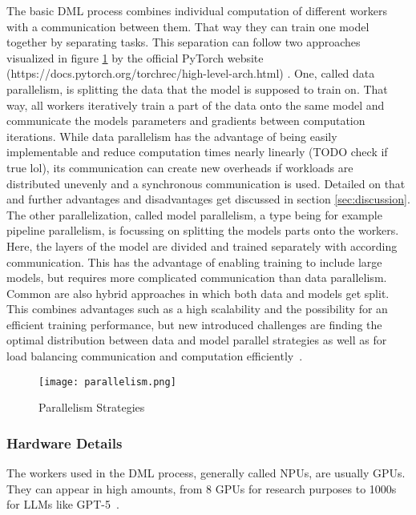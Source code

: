 The basic \ac{DML} process combines individual computation of different workers with a communication between them. That way they can train one model together by separating tasks. This separation can follow two approaches visualized in figure \ref{fig:parallelism} by the official PyTorch website (https://docs.pytorch.org/torchrec/high-level-arch.html) \cite{noauthor_torchrec_nodate}. %
One, called data parallelism, is splitting the data that the model is supposed to train on. That way, all workers iteratively train a part of the data onto the same model and communicate the models parameters and gradients between computation iterations. 
While data parallelism has the advantage of being easily implementable and reduce computation times nearly linearly (TODO check if true lol), its communication can create new overheads if workloads are distributed unevenly and a synchronous communication is used. Detailed on that and further advantages and disadvantages get discussed in section \ref{sec:discussion}.
The other parallelization, called model parallelism, a type being for example pipeline parallelism, is focussing on splitting the models parts onto the workers. Here, the layers of the model are divided and trained separately with according communication. This has the advantage of enabling training to include large models, but requires more complicated communication than data parallelism.
Common are also hybrid approaches in which both data and models get split. This combines advantages such as a high scalability and the possibility for an efficient training performance, but new introduced challenges are finding the optimal distribution  between data and model parallel strategies as well as for load balancing communication and computation efficiently~\cite{boehm_hybrid_2014}.

\begin{figure}[h]  %
  \centering
  \texttt{[image: parallelism.png]}
  \caption{Parallelism Strategies}
  \label{fig:parallelism}
\end{figure}

\subsubsection*{Hardware Details}
The workers used in the \ac{DML} process, generally called \acp{NPU}, are usually \acp{GPU}. They can appear in high amounts, from 8 \acp{GPU} for research purposes to 1000s for \acp{LLM} like GPT-5~\cite{network_how_2024}. %

